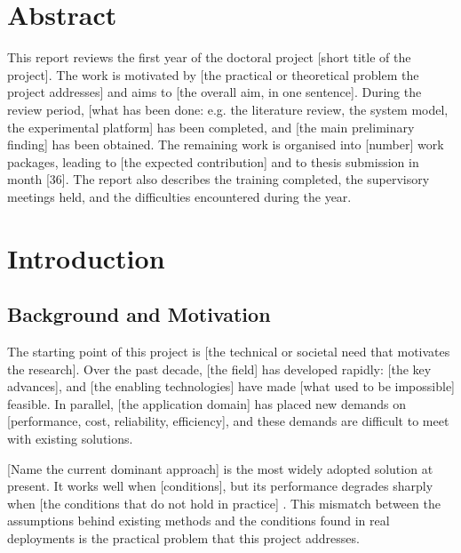 \documentclass{article}
\begin{document}
\tableofcontents

\newpage
\section*{Abstract}

This report reviews the first year of the doctoral project [short title of the project]. The
work is motivated by [the practical or theoretical problem the project addresses] and aims to
[the overall aim, in one sentence]. During the review period, [what has been done: e.g. the
literature review, the system model, the experimental platform] has been completed, and
[the main preliminary finding] has been obtained. The remaining work is organised into [number]
work packages, leading to [the expected contribution] and to thesis submission in month
[36]. The report also describes the training completed, the supervisory meetings held, and the
difficulties encountered during the year.

\section{Introduction}

\subsection{Background and Motivation}
The starting point of this project is [the technical or societal need that motivates the
research]. Over the past decade, [the field] has developed rapidly: [the key advances], and
[the enabling technologies] have made [what used to be impossible] feasible. In parallel, [the application domain] has placed new demands on
[performance, cost, reliability, efficiency], and these demands are difficult to meet with
existing solutions.

[Name the current dominant approach] is the most widely adopted solution at present. It works
well when [conditions], but its performance degrades sharply when [the conditions that do not
hold in practice] \cite{vaswani2017attention}. This mismatch between the assumptions behind
existing methods and the conditions found in real deployments is the practical problem that
this project addresses.
\end{document}
